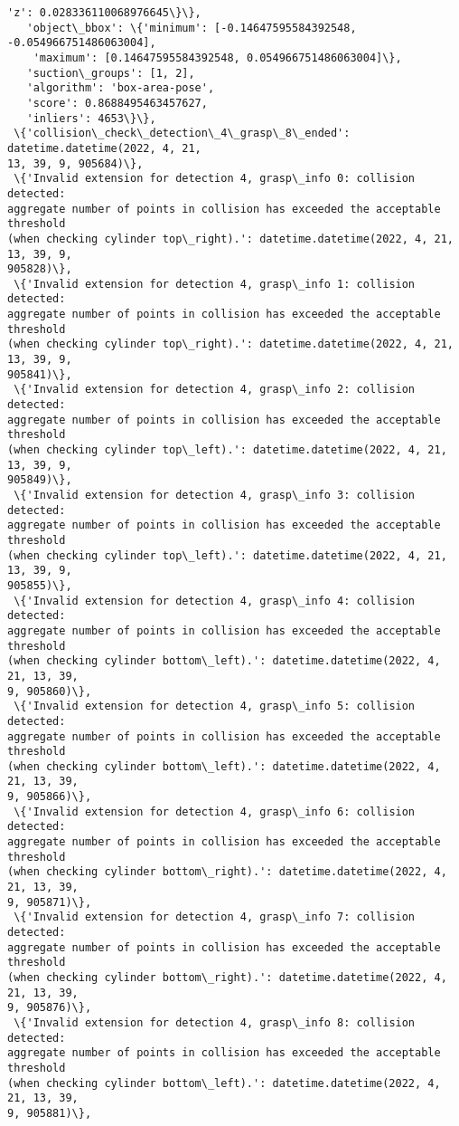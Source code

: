 \documentclass[11pt]{article}
\begin{document}
\begin{tcolorbox}[breakable, size=fbox, boxrule=.5pt, pad at break*=1mm, opacityfill=0]
\begin{Verbatim}[commandchars=\\\{\}]
     'z': 0.028336110068976645\}\},
   'object\_bbox': \{'minimum': [-0.14647595584392548, -0.054966751486063004],
    'maximum': [0.14647595584392548, 0.054966751486063004]\},
   'suction\_groups': [1, 2],
   'algorithm': 'box-area-pose',
   'score': 0.8688495463457627,
   'inliers': 4653\}\},
 \{'collision\_check\_detection\_4\_grasp\_8\_ended': datetime.datetime(2022, 4, 21,
13, 39, 9, 905684)\},
 \{'Invalid extension for detection 4, grasp\_info 0: collision detected:
aggregate number of points in collision has exceeded the acceptable threshold
(when checking cylinder top\_right).': datetime.datetime(2022, 4, 21, 13, 39, 9,
905828)\},
 \{'Invalid extension for detection 4, grasp\_info 1: collision detected:
aggregate number of points in collision has exceeded the acceptable threshold
(when checking cylinder top\_right).': datetime.datetime(2022, 4, 21, 13, 39, 9,
905841)\},
 \{'Invalid extension for detection 4, grasp\_info 2: collision detected:
aggregate number of points in collision has exceeded the acceptable threshold
(when checking cylinder top\_left).': datetime.datetime(2022, 4, 21, 13, 39, 9,
905849)\},
 \{'Invalid extension for detection 4, grasp\_info 3: collision detected:
aggregate number of points in collision has exceeded the acceptable threshold
(when checking cylinder top\_left).': datetime.datetime(2022, 4, 21, 13, 39, 9,
905855)\},
 \{'Invalid extension for detection 4, grasp\_info 4: collision detected:
aggregate number of points in collision has exceeded the acceptable threshold
(when checking cylinder bottom\_left).': datetime.datetime(2022, 4, 21, 13, 39,
9, 905860)\},
 \{'Invalid extension for detection 4, grasp\_info 5: collision detected:
aggregate number of points in collision has exceeded the acceptable threshold
(when checking cylinder bottom\_left).': datetime.datetime(2022, 4, 21, 13, 39,
9, 905866)\},
 \{'Invalid extension for detection 4, grasp\_info 6: collision detected:
aggregate number of points in collision has exceeded the acceptable threshold
(when checking cylinder bottom\_right).': datetime.datetime(2022, 4, 21, 13, 39,
9, 905871)\},
 \{'Invalid extension for detection 4, grasp\_info 7: collision detected:
aggregate number of points in collision has exceeded the acceptable threshold
(when checking cylinder bottom\_right).': datetime.datetime(2022, 4, 21, 13, 39,
9, 905876)\},
 \{'Invalid extension for detection 4, grasp\_info 8: collision detected:
aggregate number of points in collision has exceeded the acceptable threshold
(when checking cylinder bottom\_left).': datetime.datetime(2022, 4, 21, 13, 39,
9, 905881)\},

\end{Verbatim}
\end{tcolorbox}
\end{document}
